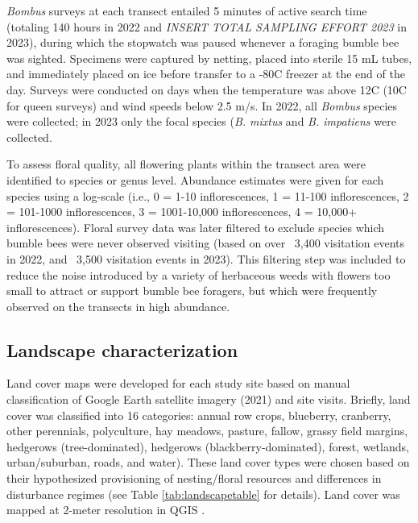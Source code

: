 \documentclass[12pt]{article}
\begin{document}
\textit{Bombus} surveys at each transect entailed 5 minutes of active search time (totaling 140 hours in 2022 and \emph{INSERT TOTAL SAMPLING EFFORT 2023} in 2023), during which the stopwatch was paused whenever a foraging bumble bee was sighted. Specimens were captured by netting, placed into sterile 15 mL tubes, and immediately placed on ice before transfer to a -80\degree C freezer at the end of the day.  Surveys were conducted on days when the temperature was above 12\degree C (10\degree C for queen surveys) and wind speeds below 2.5 m/s. In 2022, all \textit{Bombus} species were collected; in 2023 only the focal species (\textit{B. mixtus} and \textit{B. impatiens} were collected.

To assess floral quality, all flowering plants within the transect area were identified to species or genus level. Abundance estimates were given for each species using a log-scale (i.e., 0 = 1-10 inflorescences, 1 = 11-100 inflorescences, 2 = 101-1000 inflorescences, 3 = 1001-10,000 inflorescences,  4 = 10,000+ inflorescences). Floral survey data was later filtered to exclude species which bumble bees were never observed visiting (based on over ~3,400 visitation events in 2022, and ~3,500 visitation events in 2023). This filtering step was included to reduce the noise introduced by a variety of herbaceous weeds with flowers too small to attract or support bumble bee foragers, but which were frequently observed on the transects in high abundance. 


\subsection{Landscape characterization}
Land cover maps were developed for each study site based on manual classification of Google Earth satellite imagery (2021) and site visits. Briefly, land cover was classified into 16 categories: annual row crops, blueberry, cranberry, other perennials, polyculture, hay meadows, pasture, fallow, grassy field margins, hedgerows (tree-dominated), hedgerows (blackberry-dominated), forest, wetlands, urban/suburban, roads, and water). These land cover types were chosen based on their hypothesized provisioning of nesting/floral resources and differences in disturbance regimes (see Table \ref{tab:landscapetable} for details). Land cover was mapped at 2-meter resolution in QGIS \parencite{QGIS_software}. 

\end{document}
